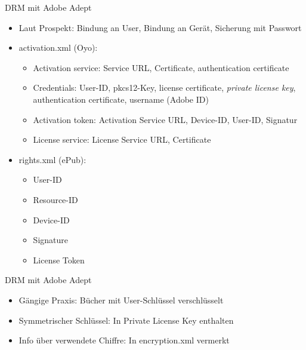 \begin{frame}{DRM mit Adobe Adept}
	\begin{itemize}
		\item Laut Prospekt: Bindung an User, Bindung an Gerät, Sicherung mit Passwort
		\item activation.xml (Oyo):
		\begin{itemize}
			\item Activation service: Service URL, Certificate, authentication certificate
			\item Credentials: User-ID, pkcs12-Key, license certificate, {\em private license key}, authentication certificate, username (Adobe ID)
			\item Activation token: Activation Service URL, Device-ID, User-ID, Signatur
			\item License service: License Service URL, Certificate
		\end{itemize}
		\item rights.xml (ePub):
		\begin{itemize}
			\item User-ID
			\item Resource-ID
			\item Device-ID
			\item Signature
			\item License Token
		\end{itemize}
	\end{itemize}
\end{frame}


\begin{frame}{DRM mit Adobe Adept}
	\begin{itemize}
		\item Gängige Praxis: Bücher mit User-Schlüssel verschlüsselt
		\item Symmetrischer Schlüssel: In Private License Key enthalten
		\item Info über verwendete Chiffre: In encryption.xml vermerkt
	\end{itemize}
\end{frame}

